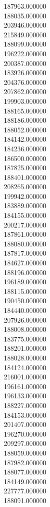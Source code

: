 187963.000000\\
188035.000000\\
203946.000000\\
215849.000000\\
188099.000000\\
196222.000000\\
200387.000000\\
183926.000000\\
204376.000000\\
207862.000000\\
199903.000000\\
188165.000000\\
188186.000000\\
188052.000000\\
184142.000000\\
184236.000000\\
186500.000000\\
187825.000000\\
188401.000000\\
208265.000000\\
199942.000000\\
183889.000000\\
184155.000000\\
200217.000000\\
187861.000000\\
188080.000000\\
187817.000000\\
184627.000000\\
188196.000000\\
196189.000000\\
188115.000000\\
190450.000000\\
184440.000000\\
207926.000000\\
188008.000000\\
183775.000000\\
188201.000000\\
188028.000000\\
184124.000000\\
216001.000000\\
196161.000000\\
196133.000000\\
188227.000000\\
184153.000000\\
201407.000000\\
196270.000000\\
209297.000000\\
188059.000000\\
187982.000000\\
188077.000000\\
184149.000000\\
227777.000000\\
188091.000000\\

